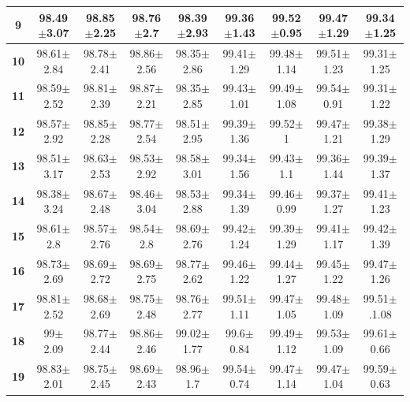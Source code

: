 \begin{table}[h!]
{\begin{tabular}{|*{9}{c|}}
		\textbf{9}     & 98.49$ \pm $3.07 & 98.85$ \pm $2.25 & 98.76$ \pm $2.7 & 98.39$ \pm $2.93 & 99.36$ \pm $1.43 & 99.52$ \pm $0.95 & 99.47$ \pm $1.29 & 99.34$ \pm $1.25 \\\hline
		\textbf{10}    & 98.61$ \pm $2.84 & 98.78$ \pm $2.41 & 98.86$ \pm $2.56 & 98.35$ \pm $2.86 & 99.41$ \pm $1.29 & 99.48$ \pm $1.14 & 99.51$ \pm $1.23 & 99.31$ \pm $1.25 \\\hline
		\textbf{11}    & 98.59$ \pm $2.52 & 98.81$ \pm $2.39 & 98.87$ \pm $2.21 & 98.35$ \pm $2.85 & 99.43$ \pm $1.01 & 99.49$ \pm $1.08 & 99.54$ \pm $0.91 & 99.31$ \pm $1.22 \\\hline
		\textbf{12}    & 98.57$ \pm $2.92 & 98.85$ \pm $2.28 & 98.77$ \pm $2.54 & 98.51$ \pm $2.95 & 99.39$ \pm $1.36 & 99.52$ \pm $1 & 99.47$ \pm $1.21 & 99.38$ \pm $1.29 \\\hline
		\textbf{13}    & 98.51$ \pm $3.17 & 98.63$ \pm $2.53 & 98.53$ \pm $2.92 & 98.58$ \pm $3.01 & 99.34$ \pm $1.56 & 99.43$ \pm $1.1 & 99.36$ \pm $1.44 & 99.39$ \pm $1.37 \\\hline
		\textbf{14}    & 98.38$ \pm $3.24 & 98.67$ \pm $2.48 & 98.46$ \pm $3.04 & 98.53$ \pm $2.88 & 99.34$ \pm $1.39 & 99.46$ \pm $0.99 & 99.37$ \pm $1.27 & 99.41$ \pm $1.23 \\\hline
		\textbf{15}    & 98.61$ \pm $2.8 & 98.57$ \pm $2.76 & 98.54$ \pm $2.8 & 98.69$ \pm $2.76 & 99.42$ \pm $1.24 & 99.39$ \pm $1.29 & 99.41$ \pm $1.17 & 99.42$ \pm $1.39 \\\hline
		\textbf{16}    & 98.73$ \pm $2.69 & 98.69$ \pm $2.72 & 98.69$ \pm $2.75 & 98.77$ \pm $2.62 & 99.46$ \pm $1.22 & 99.44$ \pm $1.27 & 99.45$ \pm $1.22 & 99.47$ \pm $1.26 \\\hline
		\textbf{17}    & 98.81$ \pm $2.52 & 98.68$ \pm $2.69 & 98.75$ \pm $2.48 & 98.76$ \pm $2.77 & 99.51$ \pm $1.11 & 99.47$ \pm $1.05 & 99.48$ \pm $1.09 & 99.51$ \pm $.1.08 \\\hline
		\textbf{18}    & 99$ \pm $2.09 & 98.77$ \pm $2.44 & 98.86$ \pm $2.46 & 99.02$ \pm $1.77 & 99.6$ \pm $0.84 & 99.49$ \pm $1.12 & 99.53$ \pm $1.09 & 99.61$ \pm $0.66 \\\hline
		\textbf{19}    & 98.83$ \pm $2.01 & 98.75$ \pm $2.45 & 98.69$ \pm $2.43 & 98.96$ \pm $1.7 & 99.54$ \pm $0.74 & 99.47$ \pm $1.14 & 99.47$ \pm $1.04 & 99.59$ \pm $0.63 \\\hline
	\end{tabular}%
	}
	\label{Table: CV_3feats}%
\end{table}%

